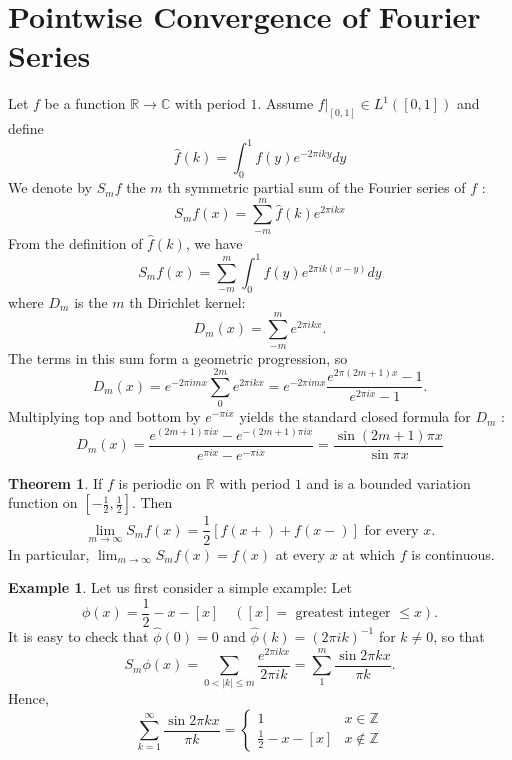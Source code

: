\documentclass[12pt,a4paper]{book}
\newcommand{\bb}[1]{\mathbb{#1}}
\newenvironment{enu}{\begin{enumerate}[(1)]}{\end{enumerate}}
\theoremstyle{definition}
\newtheorem{theo}[defn]{Theorem}
\newtheorem{exam}[defn]{Example}
\begin{document}
\section{Pointwise Convergence of Fourier Series}
Let $f$ be a function 
$\bb{R}\rightarrow \bb{C}$ with period $1$. 
Assume $\left.f\right|_{[0,1]}\in L^1([0,1])$ and define 
\begin{equation*}
    \widehat{f}(k)=\int_0^1 f(y)e^{-2\pi i ky} dy
\end{equation*}
We denote by $S_m f$ the $m$ th symmetric partial sum of the Fourier series of $f$ :
$$
S_m f(x)=\sum_{-m}^m \widehat{f}(k) e^{2 \pi i k x}
$$
From the definition of $\widehat{f}(k)$, we have
$$
S_m f(x)=\sum_{-m}^m \int_0^1 f(y) e^{2 \pi i k(x-y)} d y
$$
where $D_m$ is the $m$ th Dirichlet kernel:
$$
D_m(x)=\sum_{-m}^m e^{2 \pi i k x} .
$$
The terms in this sum form a geometric progression, so
$$
D_m(x)=e^{-2 \pi i m x} \sum_0^{2 m} e^{2 \pi i k x}=e^{-2 \pi i m x} \frac{e^{2 \pi(2 m+1) x}-1}{e^{2 \pi i x}-1} .
$$
Multiplying top and bottom by $e^{-\pi i x}$ yields the standard closed formula for $D_m$ :
$$
D_m(x)=\frac{e^{(2 m+1) \pi i x}-e^{-(2 m+1) \pi i x}}{e^{\pi i x}-e^{-\pi i x}}=\frac{\sin (2 m+1) \pi x}{\sin \pi x} 
$$
\begin{theo}
    If $f$ is periodic on $\mathbb{R}$ with period $1$ 
    and is a bounded variation function on $\left[-\frac{1}{2}, \frac{1}{2}\right]$. 
    Then
    $$
    \lim _{m \rightarrow \infty} S_m f(x)=\frac{1}{2}[f(x+)+f(x-)] \text { for every } x .
    $$
    In particular, $\lim _{m \rightarrow \infty} S_m f(x)=f(x)$ at every $x$ at which $f$ is continuous.
\end{theo}
\begin{exam}
    Let us first consider a simple example: Let
    $$
    \phi(x)=\frac{1}{2}-x-[x] \quad([x]=\text { greatest integer } \leq x) .
    $$
    It is easy to check that $\widehat{\phi}(0)=0$ and $\widehat{\phi}(k)=(2 \pi i k)^{-1}$ for $k \neq 0$, so that
    $$
    S_m \phi(x)=\sum_{0<|k| \leq m} \frac{e^{2 \pi i k x}}{2 \pi i k}=\sum_1^m \frac{\sin 2 \pi k x}{\pi k} .
    $$
    Hence, 
    $$
    \sum_{k=1}^\infty \frac{\sin 2 \pi k x}{\pi k}=\begin{cases}
        
        
        1                  & x\in \bb{Z} \\ 
        \frac{1}{2}-x-[x]  & x\notin \bb{Z}
    \end{cases} 
    $$
\end{exam}
\end{document}

